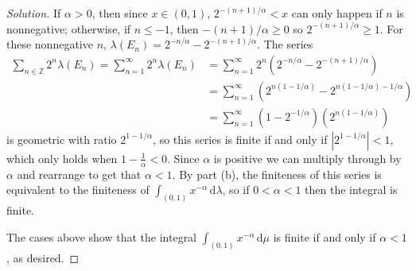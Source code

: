 \documentclass[10pt]{article}
\newcommand{\dd}{\,\mathrm{d}}
\providecommand{\ZZ}{\mathbb Z}
\newenvironment{soln}{\begin{proof}[Solution]}{\end{proof}}
\providecommand{\abs}[1]{\left|#1\right|}
\begin{document}
\begin{soln}
    If $\alpha > 0$, then
    since $x\in(0,1)$, $2^{-(n+1)/\alpha} < x$ can only happen
    if $n$ is nonnegative; otherwise, if $n\le -1$, then
    $-(n+1)/\alpha \ge 0$ so $2^{-(n+1)/\alpha}\ge 1$.
    For these nonnegative $n$,
    $\lambda(E_n) = 2^{-n/\alpha} - 2^{-(n+1)/\alpha}$.
    The series
    \begin{align*}
	\sum_{n\in\ZZ} 2^n\lambda(E_n) = \sum_{n=1}^\infty 2^n\lambda(E_n)
	&= \sum_{n=1}^\infty 2^n(2^{-n/\alpha} - 2^{-(n+1)/\alpha}) \\
	&= \sum_{n=1}^\infty (2^{n(1-1/\alpha)} - 2^{n(1-1/\alpha)-1/\alpha}) \\
	&= \sum_{n=1}^\infty (1-2^{-1/\alpha})(2^{n(1-1/\alpha)})
    \end{align*}
    is geometric with ratio $2^{1-1/\alpha}$, so this series is finite
    if and only if $\abs{2^{1-1/\alpha}} < 1$, which only holds when
    $1 - \frac 1\alpha < 0$. Since $\alpha$ is positive we can multiply through
    by $\alpha$ and rearrange to get that $\alpha < 1$.
    By part (b), the finiteness of this series is equivalent
    to the finiteness of $\int_{(0,1)}x^{-\alpha}\dd\lambda$,
    so if $0 < \alpha < 1$ then the integral is finite.

    The cases above show that the integral $\int_{(0,1)} x^{-\alpha}\dd\mu$
    is finite if and only if $\alpha < 1$, as desired.
\end{soln}
\end{document}
